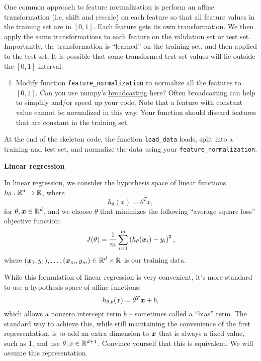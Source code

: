\documentclass{article}
\newcommand{\nyuparagrah}[1]{\textcolor{nyupurple}{\large #1}}
\begin{document}
One common approach to feature normalization is perform
an affine transformation (i.e. shift and rescale) on each feature
so that all feature values in the training set are in $[0,1]$. Each
feature gets its own transformation. We then apply the same transformations
to each feature on the validation set or test set. Importantly, the transformation is ``learned'' on the
training set, and then applied to the test set. It is possible that
some transformed test set values will lie outside the $[0,1]$ interval.

\begin{enumerate}
\setcounter{enumi}{\value{saveenum}}
    \item Modify function \texttt{feature\_normalization} to normalize all the
features to $[0,1]$. Can you use numpy's \href{https://docs.scipy.org/doc/numpy/user/basics.broadcasting.html}{broadcasting} here? Often broadcasting can help to simplify and/or speed up your code. Note that a feature with constant value cannot be normalized in
this way. Your function should discard features that are constant
in the training set.
\setcounter{saveenum}{\value{enumi}}
\end{enumerate}

At the end of the skeleton code, the function \texttt{load\_data} loads, split into a training and test set, and normalize the data using your \texttt{feature\_normalization}.

\nyuparagrah{\bf Linear regression}

In linear regression, we consider the hypothesis space of linear functions
$h_{\theta}:\mathbb{R}^{d}\to\mathbb{R}$, where
\[
h_{\theta}(x)=\theta^{T}x,
\]
for $\theta,\boldsymbol{x}\in\mathbb{R}^{d}$, and we choose $\theta$ that minimizes
the following ``average square loss'' objective function: 
\[
J(\theta)=\frac{1}{m}\sum_{i=1}^{m}\left(h_{\theta}(\boldsymbol{x}_{i})-y_{i}\right)^{2},
\]
where $(\boldsymbol{x}_{1},y_{1}),\ldots,(\boldsymbol{x}_{m},y_{m})\in\mathbb{R}^{d}\times\mathbb{R}$
is our training data.

While this formulation of linear regression is very convenient, it's
more standard to use a hypothesis space of affine functions:
\[
h_{\theta,b}(x)=\theta^{T} \boldsymbol{x}+b,
\]
which allows a nonzero intercept term $b$ -- sometimes called a ``bias'' term. The standard
way to achieve this, while still maintaining the convenience of the
first representation, is to add an extra dimension to $\boldsymbol{x}$ that is
always a fixed value, such as 1, and use $\theta,x\in\mathbb{R}^{d+1}$. Convince yourself that
this is equivalent. 
We will assume this representation. 
\end{document}
